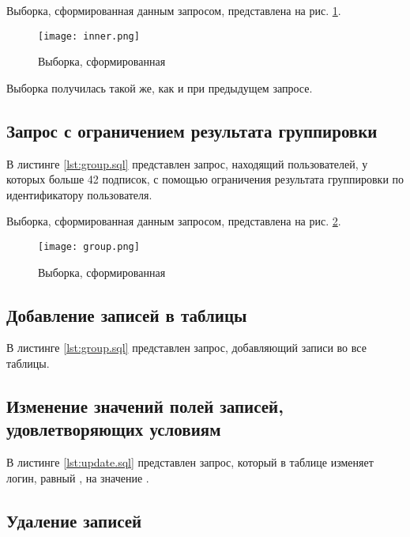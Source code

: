 Выборка, сформированная данным запросом, представлена на рис. \ref{fig:inner}.

\begin{figure}[H]
	\centering
	\texttt{[image: inner.png]}
	\caption{Выборка, сформированная }
	\label{fig:inner}
\end{figure}

Выборка получилась такой же, как и при предыдущем запросе.

\subsection{Запрос с ограничением результата группировки}

В листинге \ref{lst:group.sql} представлен запрос, находящий пользователей, у которых больше 42 подписок, с помощью ограничения результата группировки по идентификатору пользователя.



Выборка, сформированная данным запросом, представлена на рис. \ref{fig:group}.

\begin{figure}[H]
	\centering
	\texttt{[image: group.png]}
	\caption{Выборка, сформированная }
	\label{fig:group}
\end{figure}

\subsection{Добавление записей в таблицы}

В листинге \ref{lst:group.sql} представлен запрос, добавляющий записи во все таблицы.



\subsection{Изменение значений полей записей, удовлетворяющих условиям}

В листинге \ref{lst:update.sql} представлен запрос, который в таблице  изменяет логин, равный , на значение .



\subsection{Удаление записей}

